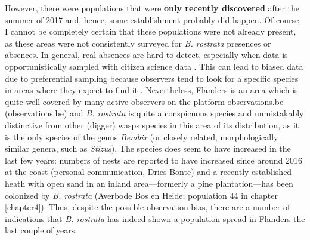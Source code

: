 \documentclass[10pt, twoside]{book} %
\begin{document}
	 However, there were populations that were \textbf{only recently discovered} after the summer of 2017 and, hence, some establishment probably did happen. Of course, I cannot be completely certain that these populations were not already present, as these areas were not consistently surveyed for \textit{B. rostrata} presences or absences. In general, real absences are hard to detect, especially when data is opportunistically sampled with citizen science data \citep{barbet-massin2012}. This can lead to biased data due to preferential sampling because observers tend to look for a specific species in areas where they expect to find it \citep{pennino2019}. Nevertheless, Flanders is an area which is quite well covered by many active observers on the platform observations.be (observations.be) and \textit{B. rostrata} is quite a conspicuous species and unmistakably distinctive from other (digger) wasps species in this area of its distribution, as it is the only species of the genus \textit{Bembix} (or closely related, morphologically similar genera, such as \textit{Stizus}). The species does seem to have increased in the last few years: numbers of nests are reported to have increased since around 2016 at the coast (personal communication, Dries Bonte) and a recently established heath with open sand in an inland area---formerly a pine plantation---has been colonized by \textit{B. rostrata} (Averbode Bos en Heide; population 44 in chapter \ref{chapter4}). Thus, despite the possible observation bias, there are a number of indications that \textit{B. rostrata} has indeed shown a population spread in Flanders the last couple of years.\\
	
\end{document}
